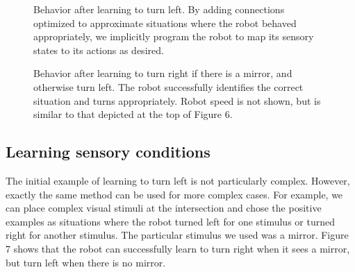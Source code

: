 \documentclass[conference]{IEEEtran}
\begin{document}
\begin{figure}[!t]
\label{Left}
\centering
\caption{Behavior after learning to turn left. By adding connections
optimized to approximate situations where the robot behaved appropriately,
we implicitly program the robot to map its sensory states to its actions as
desired.}
\end{figure}

\begin{figure}[!t]
\label{Right}
\centering
\caption{Behavior after learning to turn right if there is a mirror, and otherwise turn left. The robot successfully identifies the correct situation and turns appropriately. Robot speed is not shown, but is similar to that depicted at the top of Figure 6.}
\end{figure}

\subsection{Learning sensory conditions}

The initial example of learning to turn left is not
particularly complex. However, exactly the same method
can be used for more complex cases. For example, we can
place complex visual stimuli at the intersection and chose
the positive examples as situations where the robot turned
left for one stimulus or turned right for another stimulus.
The particular stimulus we used was a mirror. Figure 7
shows that the robot can successfully learn to turn right
when it sees a mirror, but turn left when there is no mirror.
\end{document}
